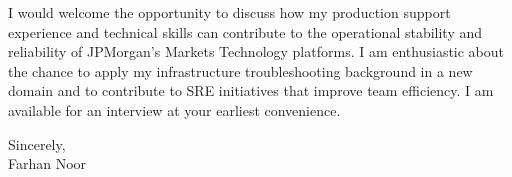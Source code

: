 \documentclass[11pt,letterpaper]{article}
\begin{document}
I would welcome the opportunity to discuss how my production support experience and technical skills can contribute to the operational stability and reliability of JPMorgan's Markets Technology platforms. I am enthusiastic about the chance to apply my infrastructure troubleshooting background in a new domain and to contribute to SRE initiatives that improve team efficiency. I am available for an interview at your earliest convenience.

Sincerely, \\[1.5em]
Farhan Noor
\end{document}
